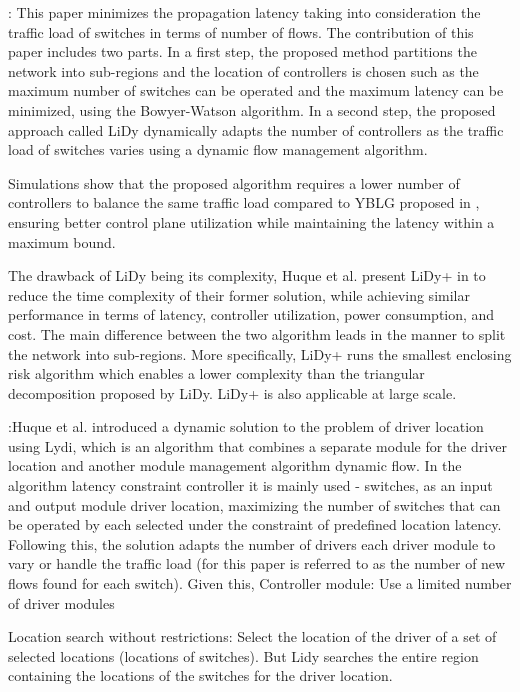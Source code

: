 \documentclass[a4paper,10pt]{article}
\begin{document}
\cite{HuJo15}: This paper minimizes the propagation latency taking into consideration the traffic load of switches in terms of number of flows.  The contribution of this paper includes two parts. In a first step, the proposed method partitions the network into sub-regions and the location of controllers is chosen such as the maximum number of switches can be operated and the maximum latency can be minimized,  using the Bowyer-Watson algorithm. In a second step, the proposed approach called LiDy dynamically adapts the number of controllers as the traffic load of switches varies using a dynamic flow management algorithm.

Simulations show that the proposed algorithm requires a lower number of controllers to balance the same traffic load compared to YBLG proposed in \cite{YaBi14}, ensuring better control plane utilization while maintaining the latency within a maximum bound. 

The drawback of LiDy being its complexity, Huque et al. present LiDy+ in \cite{HuSi17} to reduce the time complexity of their former solution, while achieving similar performance in terms of latency, controller utilization, power consumption, and cost. The main difference between the two algorithm leads in the manner to split the network into sub-regions. More specifically, LiDy+ runs the smallest enclosing risk algorithm which enables a lower complexity than the triangular decomposition proposed by LiDy. LiDy+ is also applicable at large scale.

\cite{HuJo15}:Huque et al. introduced a dynamic solution to the problem of driver location using Lydi, which is an algorithm that combines a separate module for the driver location and another module management algorithm dynamic flow. In the algorithm latency constraint controller it is mainly used - switches, as an input and output module driver location, maximizing the number of switches that can be operated by each selected under the constraint of predefined location latency. Following this, the solution adapts the number of drivers each driver module to vary or handle the traffic load (for this paper is referred to as the number of new flows found for each switch). Given this,
Controller module: Use a limited number of driver modules

Location search without restrictions: Select the location of the driver of a set of selected locations (locations of switches). But Lidy searches the entire region containing the locations of the switches for the driver location.
\end{document}
